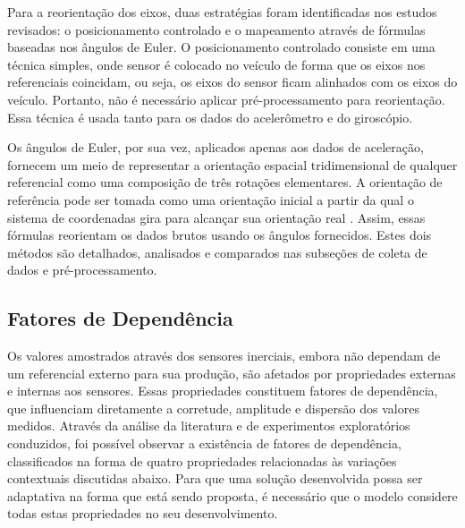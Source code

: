 Para a reorientação dos eixos, duas estratégias foram identificadas nos estudos revisados: o posicionamento controlado e o mapeamento através de fórmulas baseadas nos ângulos de Euler. O posicionamento controlado consiste em uma técnica simples, onde sensor é colocado no veículo de forma que os eixos nos referenciais coincidam, ou seja, os eixos do sensor ficam alinhados com os eixos do veículo. Portanto, não é necessário aplicar pré-processamento para reorientação. Essa técnica é usada tanto para os dados do acelerômetro e do giroscópio. 

Os ângulos de Euler, por sua vez, aplicados apenas aos dados de aceleração, fornecem um meio de representar a orientação espacial tridimensional de qualquer referencial como uma composição de três rotações elementares. A orientação de referência pode ser tomada como uma orientação inicial a partir da qual o sistema de coordenadas gira para alcançar sua orientação real \cite{Singh2017}. Assim, essas fórmulas reorientam os dados brutos usando os ângulos fornecidos. Estes dois métodos são detalhados, analisados e comparados nas subseções de coleta de dados e pré-processamento. 

\subsection{Fatores de Dependência}

Os valores amostrados através dos sensores inerciais, embora não dependam de um referencial externo para sua produção, são afetados por propriedades externas e internas aos sensores. Essas propriedades constituem fatores de dependência, que influenciam diretamente a corretude, amplitude e dispersão dos valores medidos. Através da análise da literatura e de experimentos exploratórios conduzidos, foi possível observar a existência de fatores de dependência, classificados na forma de quatro propriedades relacionadas às variações contextuais discutidas abaixo. Para que uma solução desenvolvida possa ser adaptativa na forma que está sendo proposta, é necessário que o modelo considere todas estas propriedades no seu desenvolvimento.

